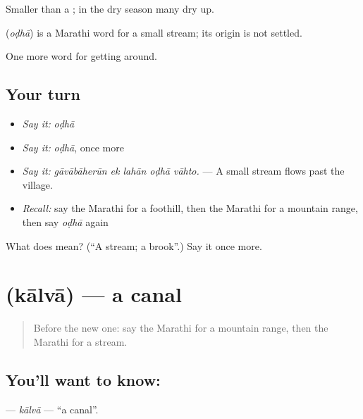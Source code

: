 Smaller than a ; in the dry season many  dry up.

\begin{cousinweb}
\textbf{} (\emph{oḍhā}) is a Marathi word for a small stream; its origin is not settled.
\end{cousinweb}

\begin{grammarlens}[title={What you've built}]
One more word for getting around.
\end{grammarlens}

\subsection*{Your turn}
\begin{itemize}
\raggedright
  \item \emph{Say it:} \emph{oḍhā}
  \item \emph{Say it:} \emph{oḍhā}, once more
  \item \emph{Say it:} \emph{gāvābāherūn ek lahān oḍhā vāhto.} — A small stream flows past the village.
  \item \emph{Recall:} say the Marathi for a foothill, then the Marathi for a mountain range, then say \emph{oḍhā} again
\end{itemize}

\begin{tcolorbox}[breakable,colback=teal!4,colframe=teal!35!black,title={Before you move on}]
What does  mean? (\textquotedblleft{}A stream; a brook\textquotedblright{}.) Say it once more.
\end{tcolorbox}
\section[\texorpdfstring{\mr{कालवा} (kālvā)}{कालवा (kālvā)}]{ (kālvā) — a canal}

\label{lesson:MR-C443-kalva}



\begin{quote}
Before the new one: say the Marathi for a mountain range, then the Marathi for a stream.
\end{quote}

\subsection*{You'll want to know: }
\textbf{} — \emph{kālvā} — \textquotedblleft{}a canal\textquotedblright{}.


